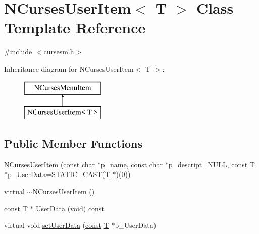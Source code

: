 \hypertarget{class_n_curses_user_item}{\section{N\-Curses\-User\-Item$<$ T $>$ Class Template Reference}
\label{class_n_curses_user_item}
}


{\ttfamily \#include $<$cursesm.\-h$>$}

Inheritance diagram for N\-Curses\-User\-Item$<$ T $>$\-:\begin{figure}[H]
\begin{center}
\leavevmode
\includegraphics[height=2.000000cm]{class_n_curses_user_item}
\end{center}
\end{figure}
\subsection*{Public Member Functions}
\begin{DoxyCompactItemize}
\item 
\hyperlink{class_n_curses_user_item_a165417a95f7b92e12af21c7d0678d171}{N\-Curses\-User\-Item} (\hyperlink{term__entry_8h_a57bd63ce7f9a353488880e3de6692d5a}{const} char $\ast$p\-\_\-name, \hyperlink{term__entry_8h_a57bd63ce7f9a353488880e3de6692d5a}{const} char $\ast$p\-\_\-descript=\hyperlink{internal_8h_a070d2ce7b6bb7e5c05602aa8c308d0c4}{N\-U\-L\-L}, \hyperlink{term__entry_8h_a57bd63ce7f9a353488880e3de6692d5a}{const} \hyperlink{curses_8priv_8h_a5ef253115820acf7d27f3c5c3b02a0f0}{T} $\ast$p\-\_\-\-User\-Data=S\-T\-A\-T\-I\-C\-\_\-\-C\-A\-S\-T(\hyperlink{curses_8priv_8h_a5ef253115820acf7d27f3c5c3b02a0f0}{T} $\ast$)(0))
\item 
virtual \hyperlink{class_n_curses_user_item_aaad701b440ece38e4bf3c2df8f8c404b}{$\sim$\-N\-Curses\-User\-Item} ()
\item 
\hyperlink{term__entry_8h_a57bd63ce7f9a353488880e3de6692d5a}{const} \hyperlink{curses_8priv_8h_a5ef253115820acf7d27f3c5c3b02a0f0}{T} $\ast$ \hyperlink{class_n_curses_user_item_aaef904f53f6d2da8ddd5cfc1c49d39e6}{User\-Data} (void) \hyperlink{term__entry_8h_a57bd63ce7f9a353488880e3de6692d5a}{const} 
\item 
virtual void \hyperlink{class_n_curses_user_item_a6a51016194c14fcc3ce9e14cfe90d7e8}{set\-User\-Data} (\hyperlink{term__entry_8h_a57bd63ce7f9a353488880e3de6692d5a}{const} \hyperlink{curses_8priv_8h_a5ef253115820acf7d27f3c5c3b02a0f0}{T} $\ast$p\-\_\-\-User\-Data)
\end{DoxyCompactItemize}
